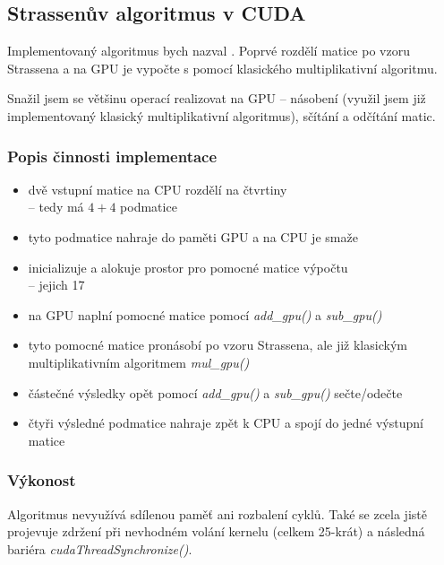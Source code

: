 \documentclass[12pt,a4paper]{article}
\begin{document}
\pagebreak
\subsection{Strassenův algoritmus v CUDA}

Implementovaný algoritmus bych nazval . Poprvé rozdělí matice po vzoru Strassena a na GPU je vypočte s pomocí klasického multiplikativní algoritmu.

\medskip
Snažil jsem se většinu operací realizovat na GPU -- násobení (využil jsem již implementovaný klasický multiplikativní algoritmus), sčítání a odčítání matic.

\subsubsection{Popis činnosti implementace}

\begin{itemize}
\item dvě vstupní matice na CPU rozdělí na čtvrtiny \\-- tedy má $4+4$ podmatice
\item tyto podmatice nahraje do paměti GPU a na CPU je smaže
\item inicializuje a alokuje prostor pro pomocné matice výpočtu \\-- jejich 17
\item na GPU naplní pomocné matice pomocí \textit{add\_gpu()} a \textit{sub\_gpu()}
\item tyto pomocné matice pronásobí po vzoru Strassena, ale již klasickým multiplikativním algoritmem \textit{mul\_gpu()}
\item částečné výsledky opět pomocí \textit{add\_gpu()} a \textit{sub\_gpu()} sečte/odečte
\item čtyři výsledné podmatice nahraje zpět k CPU a spojí do jedné výstupní matice
\end{itemize}


\subsubsection{Výkonost}

Algoritmus nevyužívá sdílenou paměť ani rozbalení cyklů. Také se zcela jistě projevuje zdržení při nevhodném volání kernelu (celkem 25-krát) a následná bariéra \textit{cudaThreadSynchronize()}.
\end{document}
